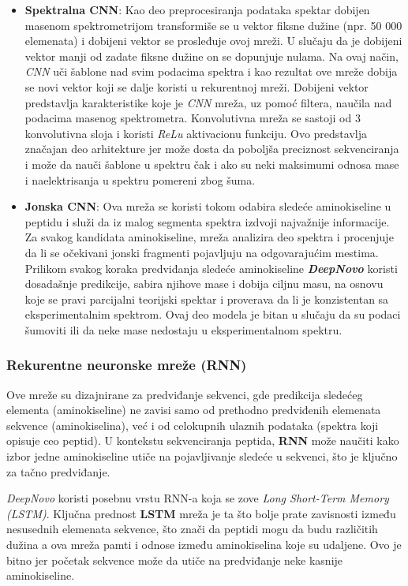 \documentclass[12pt,oneside]{memoir}
\begin{document}
\begin{itemize}
\item \textbf{Spektralna CNN}: Kao deo preprocesiranja podataka spektar dobijen masenom spektrometrijom transformiše se u vektor fiksne dužine (npr. 50 000 elemenata) i dobijeni vektor se prosleđuje ovoj mreži. U slučaju da je dobijeni vektor manji od zadate fiksne dužine on se dopunjuje nulama. Na ovaj način, \emph{CNN} uči šablone nad svim podacima spektra i kao rezultat ove mreže dobija se novi vektor koji se dalje koristi u rekurentnoj mreži. Dobijeni vektor predstavlja karakteristike koje je \emph{CNN} mreža, uz pomoć filtera, naučila nad podacima masenog spektrometra. Konvolutivna mreža se sastoji od 3 konvolutivna sloja i koristi \emph{ReLu} aktivacionu funkciju. Ovo predstavlja značajan deo arhitekture jer može dosta da poboljša preciznost sekvenciranja i može da nauči šablone u spektru čak i ako su neki maksimumi odnosa mase i naelektrisanja u spektru pomereni zbog šuma.
\item \textbf{Jonska CNN}: Ova mreža se koristi tokom odabira sledeće aminokiseline u peptidu i služi da iz malog segmenta spektra izdvoji najvažnije informacije. Za svakog kandidata aminokiseline, mreža analizira deo spektra i procenjuje da li se očekivani jonski fragmenti pojavljuju na odgovarajućim mestima. Prilikom svakog koraka predviđanja sledeće aminokiseline \textbf{\emph{DeepNovo}} koristi dosadašnje predikcije, sabira njihove mase i dobija ciljnu masu, na osnovu koje se pravi parcijalni teorijski spektar i proverava da li je konzistentan sa eksperimentalnim spektrom. Ovaj deo modela je bitan u slučaju da su podaci šumoviti ili da neke mase nedostaju u eksperimentalnom spektru.
\end{itemize}

\subsubsection{Rekurentne neuronske mreže (RNN)}
Ove mreže su dizajnirane za predviđanje sekvenci, gde predikcija sledećeg elementa (aminokiseline) ne zavisi samo od prethodno predviđenih elemenata sekvence (aminokiselina), već i od celokupnih ulaznih podataka (spektra koji opisuje ceo peptid). U kontekstu sekvenciranja peptida, \textbf{RNN} može naučiti kako izbor jedne aminokiseline utiče na pojavljivanje sledeće u sekvenci, što je ključno za tačno predviđanje.

\emph{DeepNovo} koristi posebnu vrstu RNN-a koja se zove \emph{Long Short-Term Memory (LSTM)}. Ključna prednost \textbf{LSTM} mreža je ta što bolje prate zavisnosti između nesusednih elemenata sekvence, što znači da peptidi mogu da budu različitih dužina a ova mreža pamti i odnose između aminokiselina koje su udaljene. Ovo je bitno jer početak sekvence može da utiče na predviđanje neke kasnije aminokiseline.
\end{document}
